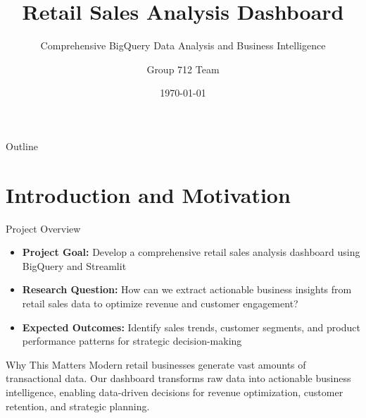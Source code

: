 \documentclass[aspectratio=169]{beamer}
\title{Retail Sales Analysis Dashboard}
\subtitle{Comprehensive BigQuery Data Analysis and Business Intelligence}
\author{Group 712 Team}
\institute{University Assignment}
\date{\today}
\begin{document}
\begin{frame}
\titlepage
\end{frame}

\begin{frame}{Outline}
\tableofcontents
\end{frame}

\section{Introduction and Motivation}

\begin{frame}{Project Overview}
\begin{itemize}
    \item \textbf{Project Goal:} Develop a comprehensive retail sales analysis dashboard using BigQuery and Streamlit
    \item \textbf{Research Question:} How can we extract actionable business insights from retail sales data to optimize revenue and customer engagement?
    \item \textbf{Expected Outcomes:} Identify sales trends, customer segments, and product performance patterns for strategic decision-making
\end{itemize}

\vspace{1cm}

\begin{block}{Why This Matters}
Modern retail businesses generate vast amounts of transactional data. Our dashboard transforms raw data into actionable business intelligence, enabling data-driven decisions for revenue optimization, customer retention, and strategic planning.
\end{block}
\end{frame}
\end{document}

